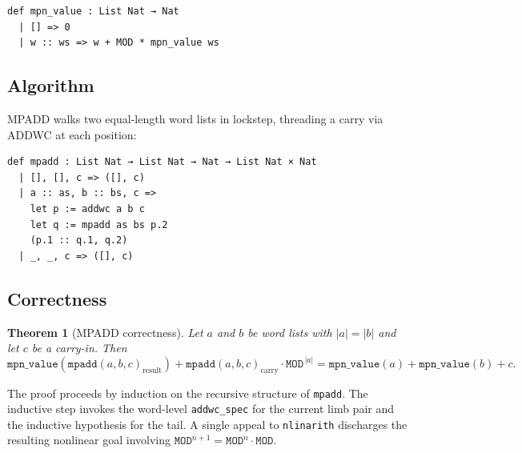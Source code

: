 \documentclass[11pt,a4paper]{article}
\newtheorem{theorem}{Theorem}[section]
\begin{document}
\begin{lstlisting}[style=lean,caption={Multi-precision value function}]
def mpn_value : List Nat → Nat
  | [] => 0
  | w :: ws => w + MOD * mpn_value ws
\end{lstlisting}

\subsection{Algorithm}

MPADD walks two equal-length word lists in lockstep, threading a carry
via ADDWC at each position:

\begin{lstlisting}[style=lean,caption={MPADD definition}]
def mpadd : List Nat → List Nat → Nat → List Nat × Nat
  | [], [], c => ([], c)
  | a :: as, b :: bs, c =>
    let p := addwc a b c
    let q := mpadd as bs p.2
    (p.1 :: q.1, q.2)
  | _, _, c => ([], c)
\end{lstlisting}

\subsection{Correctness}

\begin{theorem}[MPADD correctness]
\label{thm:mpadd}
Let $a$ and $b$ be word lists with $|a| = |b|$ and let $c$ be a
carry-in.  Then
\[
  \mathtt{mpn\_value}(\mathtt{mpadd}(a,b,c)_{\mathrm{result}})
  + \mathtt{mpadd}(a,b,c)_{\mathrm{carry}} \cdot \mathtt{MOD}^{\,|a|}
  = \mathtt{mpn\_value}(a) + \mathtt{mpn\_value}(b) + c.
\]
\end{theorem}

The proof proceeds by induction on the recursive structure of
\texttt{mpadd}.  The inductive step invokes the word-level
\texttt{addwc\_spec} for the current limb pair and the inductive
hypothesis for the tail.  A single appeal to \texttt{nlinarith}
discharges the resulting nonlinear goal involving
$\mathtt{MOD}^{n+1} = \mathtt{MOD}^n \cdot \mathtt{MOD}$.
\end{document}
